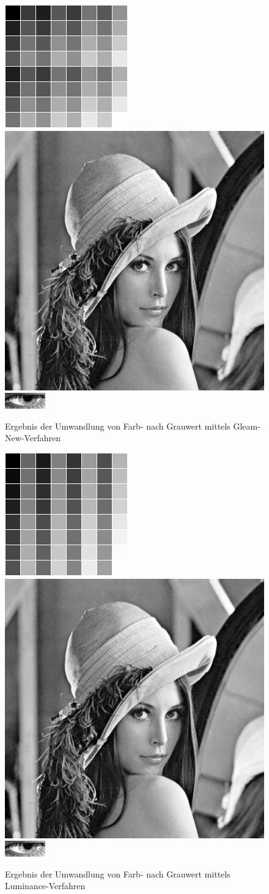 \begin{figure}[p]
	\centering
	\includegraphics[width=0.19\linewidth]{img/Farbkarte1}
	\includegraphics[width=0.19\linewidth]{img/Lena1}
	\includegraphics[width=0.19\linewidth]{img/Auge_1Gray}
	\caption{Ergebnis der Umwandlung von Farb- nach Grauwert mittels Gleam-New-Verfahren}
	\label{img_NewGeam}
\end{figure}
\begin{figure}[p]
	\centering
	\includegraphics[width=0.19\linewidth]{img/Farbkarte0}
	\includegraphics[width=0.19\linewidth]{img/Lena0}
	\includegraphics[width=0.19\linewidth]{img/Auge_0Gray}
	\caption{Ergebnis der Umwandlung von Farb- nach Grauwert mittels Luminance-Verfahren}
	\label{img_Luminance}
\end{figure}
